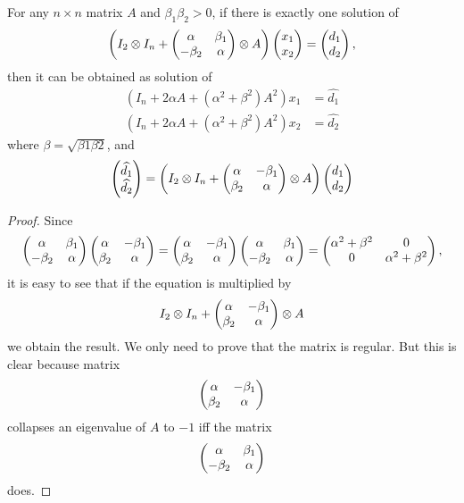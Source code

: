 \documentclass[11pt,a4paper]{article}
\begin{document}
\begin{lemma}
\label{sylv:first-lemma}
For any $n\times n$ matrix $A$ and $\beta_1\beta_2>0$, if there is
exactly one solution of
$$\left(I_2\otimes I_n +
\begin{pmatrix}\alpha&\beta_1\cr-\beta_2&\alpha\end{pmatrix}
\otimes A\right)\begin{pmatrix} x_1\cr x_2\end{pmatrix} = 
\begin{pmatrix} d_1\cr d_2\end{pmatrix},$$
then it can be obtained as solution of
\begin{align*}
\left(I_n + 2\alpha A+(\alpha^2+\beta^2)A^2\right)x_1 & = 
\widehat{d_1}\\
\left(I_n + 2\alpha A+(\alpha^2+\beta^2)A^2\right)x_2 & = 
\widehat{d_2}
\end{align*}
where $\beta=\sqrt{\beta1\beta2}$, and 
$$
\begin{pmatrix} \widehat{d_1}\cr\widehat{d_2}\end{pmatrix} =
\left(I_2\otimes I_n +
\begin{pmatrix}\alpha&-\beta_1\cr\beta_2&\alpha\end{pmatrix}
\otimes A\right)\begin{pmatrix} d_1\cr d_2\end{pmatrix}$$
\end{lemma}

\begin{proof} Since 
$$
\begin{pmatrix} \alpha&\beta_1\cr-\beta_2&\alpha\end{pmatrix}
\begin{pmatrix} \alpha&-\beta_1\cr\beta_2&\alpha\end{pmatrix}
=
\begin{pmatrix} \alpha&-\beta_1\cr\beta_2&\alpha\end{pmatrix}
\begin{pmatrix} \alpha&\beta_1\cr-\beta_2&\alpha\end{pmatrix}
=
\begin{pmatrix} \alpha^2+\beta^2&0\cr 0&\alpha^2+\beta^2\end{pmatrix},
$$
it is easy to see that if the equation is multiplied by
$$I_2\otimes I_n +
\begin{pmatrix}\alpha&-\beta_1\cr\beta_2&\alpha\end{pmatrix}
\otimes A$$
we obtain the result. We only need to prove that the matrix is
regular. But this is clear because matrix
$$\begin{pmatrix} \alpha&-\beta_1\cr\beta_2&\alpha\end{pmatrix}$$
collapses an eigenvalue of $A$ to $-1$ iff the matrix
$$\begin{pmatrix} \alpha&\beta_1\cr-\beta_2&\alpha\end{pmatrix}$$
does.
\end{proof}
\end{document}
